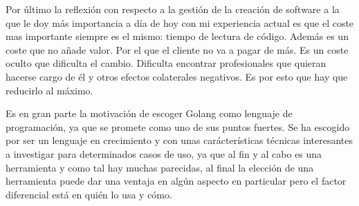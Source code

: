 Por último la reflexión con respecto a la gestión de la creación de software a la que le doy más importancia a día de hoy con mi experiencia actual es que el coste mas importante siempre es el mismo: tiempo de lectura de código. Además es un coste que no añade valor. Por el que el cliente no va a pagar de más. Es un coste oculto que dificulta el cambio. Dificulta encontrar profesionales que quieran hacerse cargo de él y otros efectos colaterales negativos. Es por esto que hay que reducirlo al máximo.

Es en gran parte la motivación de escoger Golang como lenguaje de programación, ya que se promete como uno de sus puntos fuertes. Se ha escogido por ser un lenguaje en crecimiento y con unas carácterísticas técnicas interesantes a investigar para determinados casos de uso, ya que al fin y al cabo es una herramienta y como tal hay muchas parecidas, al final la elección de una herramienta puede dar una ventaja en algún aspecto en particular pero el factor diferencial está en quién lo usa y cómo.

